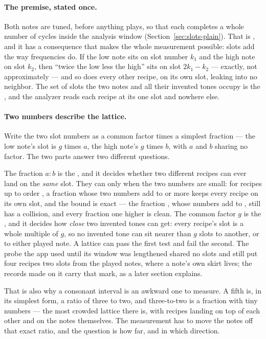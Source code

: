 \documentclass[11pt,a4paper]{article}
\begin{document}
\paragraph{The premise, stated once.} Both notes are tuned, before
anything plays, so that each completes a whole number of cycles inside the
analysis window (Section~\ref{sec:slots-plain}). That is
, and it has a consequence that makes the whole
measurement possible: slots add the way frequencies do. If the low note
sits on slot number $k_1$ and the high note on slot $k_2$, then ``twice
the low less the high'' sits on slot $2k_1 - k_2$ --- exactly, not
approximately --- and so does every other recipe, on its own slot,
leaking into no neighbor. The set of slots the two notes and all their
invented tones occupy is the , and the analyzer
reads each recipe at its one slot and nowhere else.

\paragraph{Two numbers describe the lattice.} Write the two slot numbers
as a common factor times a simplest fraction --- the low note's slot is
$g$ times $a$, the high note's $g$ times $b$, with $a$ and $b$ sharing no
factor. The two parts answer two different questions.

The fraction $a : b$ is the , and it decides whether
two different recipes can ever land on the \emph{same} slot. They can only
when the two numbers are small: for recipes up to order \imdMaxOrder{}, a
fraction whose two numbers add to \imdMinimumReducedSum{} or more keeps
every recipe on its own slot, and the bound is exact --- the fraction
\imdCollidingRatio{}, whose numbers add to \imdCollidingSum{}, still has a
collision, and every fraction one higher is clean. The common factor $g$
is the , and it decides how \emph{close} two
invented tones can get: every recipe's slot is a whole multiple of $g$, so
no invented tone can sit nearer than $g$ slots to another, or to either
played note. A lattice can pass the first test and fail the second. The
probe the app used until its window was lengthened shared no slots and
still put four recipes two slots from the played notes, where a note's own
skirt lives; the records made on it carry that mark, as a later section
explains.

That is also why a consonant interval is an awkward one to measure. A
fifth is, in its simplest form, a ratio of three to two, and
three-to-two is a fraction with tiny numbers --- the most crowded lattice
there is, with recipes landing on top of each other and on the notes
themselves. The measurement has to move the notes off that exact ratio,
and the question is how far, and in which direction.
\end{document}
